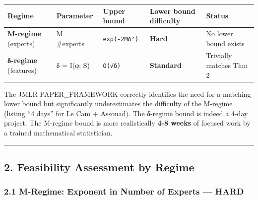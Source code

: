 \documentclass[
  12pt,
]{article}
\begin{document}
\begin{longtable}[]{@{}
  >{\raggedright\arraybackslash}p{}
  >{\raggedright\arraybackslash}p{}
  >{\raggedright\arraybackslash}p{}
  >{\raggedright\arraybackslash}p{}
  >{\raggedright\arraybackslash}p{}@{}}
\toprule\noalign{}
\begin{minipage}[b]{\linewidth}\raggedright
Regime
\end{minipage} & \begin{minipage}[b]{\linewidth}\raggedright
Parameter
\end{minipage} & \begin{minipage}[b]{\linewidth}\raggedright
Upper bound
\end{minipage} & \begin{minipage}[b]{\linewidth}\raggedright
Lower bound difficulty
\end{minipage} & \begin{minipage}[b]{\linewidth}\raggedright
Status
\end{minipage} \\
\midrule\noalign{}
\endhead
\bottomrule\noalign{}
\endlastfoot
\textbf{M-regime} (experts) & M = \#experts & \texttt{exp(-2MΔ²)} &
\textbf{Hard} & No lower bound exists \\
\textbf{δ-regime} (features) & δ = I(φ; S) & \texttt{O(√δ)} &
\textbf{Standard} & Trivially matches Thm 2 \\
\end{longtable}

The JMLR PAPER\_FRAMEWORK correctly identifies the need for a matching
lower bound but significantly underestimates the difficulty of the
M-regime (listing ``4 days'' for Le Cam + Assouad). The δ-regime bound
is indeed a 4-day project. The M-regime bound is more realistically
\textbf{4-8 weeks} of focused work by a trained mathematical
statistician.

\begin{center}\rule{0.5\linewidth}{0.5pt}\end{center}

\subsection{2. Feasibility Assessment by
Regime}\label{feasibility-assessment-by-regime}

\subsubsection{2.1 M-Regime: Exponent in Number of Experts ---
HARD}\label{m-regime-exponent-in-number-of-experts-hard}
\end{document}
